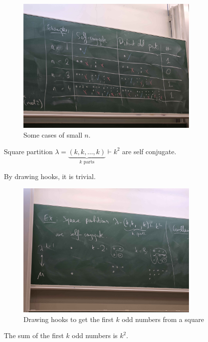 \begin{figure}[H]
    \centering
    \includegraphics[width=0.8\textwidth]{./Figures/20250923_155744.jpg}
    \caption{Some cases of small \(n\).}
    \label{fig:self conjugate distinct odd part}
\end{figure}

\begin{eg}
    Square partition \(\lambda = \underbrace{(k, k, \dots ,k)}_{k \text{ parts}} \vdash k^2\) are self conjugate. 
\end{eg}
\begin{explanation}
    By drawing hooks, it is trivial.
    \begin{figure}[H]
        \centering
        \includegraphics[width=0.8\textwidth]{Figures/20250923_161638.jpg}
        \caption{Drawing hooks to get the first \(k\) odd numbers from a square}
        \label{fig:first k odd sum is kk}
    \end{figure}
\end{explanation}

\begin{corollary}
    The sum of the first \(k\) odd numbers is \(k^2\).  
\end{corollary}

